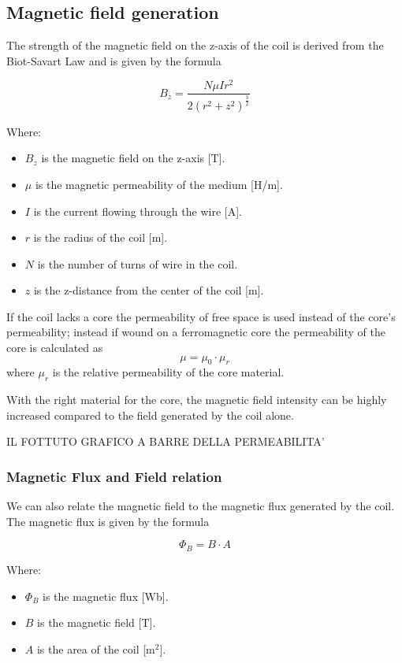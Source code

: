 \subsection{Magnetic field generation}
The strength of the magnetic field on the z-axis of the coil is derived from the Biot-Savart Law and is given by the formula
\vfill

\vfill

\begin{equation}
  B_z=\frac{N\mu Ir^2}{2(r^2+z^2)^\frac{3}{2}} \label{eq: Coil_magn_field}
\end{equation}


Where:
\begin{itemize}
  \item \( B_z \) is the magnetic field on the z-axis [T].
  \item \( \mu \) is the magnetic permeability of the medium [H/m].
  \item \( I \) is the current flowing through the wire [A].
  \item \( r \) is the radius of the coil [m].
  \item \( N \) is the number of turns of wire in the coil.
  \item \( z \) is the z-distance from the center of the coil [m].
\end{itemize}

If the coil lacks a core the permeability of free space is used instead of the core's permeability; instead if wound on a ferromagnetic core the permeability of the core is calculated as
\[\mu = \mu_0 \cdot \mu_r\]
where \( \mu_r \) is the relative permeability of the core material.

With the right material for the core, the magnetic field intensity can be highly increased compared to the field generated by the coil alone.

IL FOTTUTO GRAFICO A BARRE DELLA PERMEABILITA'

\subsubsection{Magnetic Flux and Field relation}
We can also relate the magnetic field to the magnetic flux generated by the coil. The magnetic flux is given by the formula

\begin{equation}
  \Phi_B=B \cdot A \label{eq: Magnetic_flux_&_field}
\end{equation}

Where:
\begin{itemize}
  \item \( \Phi_B \) is the magnetic flux [Wb].
  \item \( B \) is the magnetic field [T].
  \item \( A \) is the area of the coil [m\(^2\)].
\end{itemize}